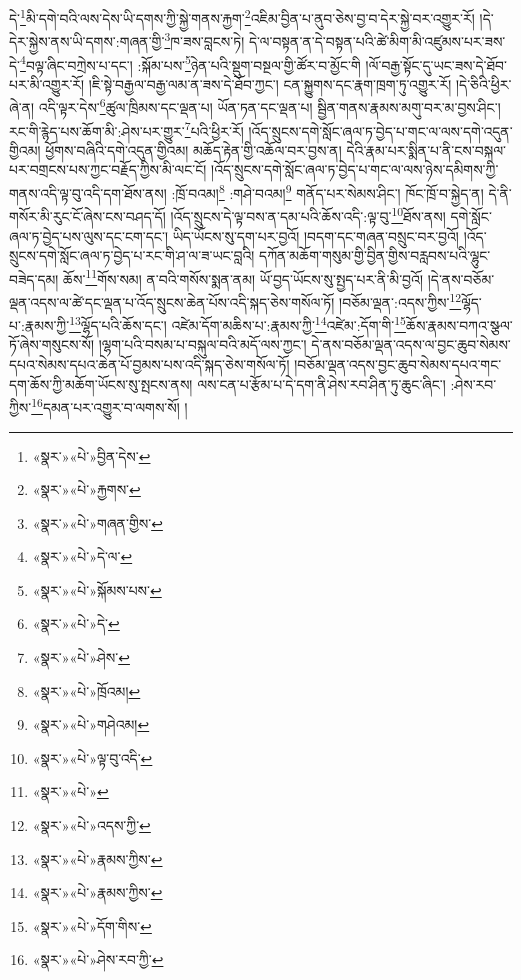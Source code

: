 དེ་\footnote{«སྣར་»«པེ་»བྱིན་དེས་}མི་དགེ་བའི་ལས་དེས་ཡི་དགས་ཀྱི་སྐྱེ་གནས་རྐྱག་\footnote{«སྣར་»«པེ་»རྐྱགས་}འཇིམ་བྱིན་པ་ནུབ་ཅེས་བྱ་བ་དེར་སྐྱེ་བར་འགྱུར་རོ། །དེ་དེར་སྐྱེས་ནས་ཡི་དགས་:གཞན་གྱི་\footnote{«སྣར་»«པེ་»གཞན་གྱིས་}ཁ་ཟས་བླངས་ཏེ། དེ་ལ་བསྟན་ན་དེ་བསྟན་པའི་ཚེ་མིག་མི་འཛུམས་པར་ཟས་དེ་\footnote{«སྣར་»«པེ་»དེ་ལ་}བལྟ་ཞིང་བཀྲེས་པ་དང་། :སྐོམ་པས་\footnote{«སྣར་»«པེ་»སྐོམས་པས་}ཉེན་པའི་སྡུག་བསྔལ་གྱི་ཚོར་བ་མྱོང་གི །ལོ་བརྒྱ་སྟོང་དུ་ཡང་ཟས་དེ་ཐོབ་པར་མི་འགྱུར་རོ། །ཇི་སྟེ་བརྒྱལ་བརྒྱ་ལམ་ན་ཟས་དེ་ཐོབ་ཀྱང་། ངན་སྐྱུགས་དང་རྣག་ཁྲག་ཏུ་འགྱུར་རོ། །དེ་ཅིའི་ཕྱིར་ཞེ་ན། འདི་ལྟར་དེས་\footnote{«སྣར་»«པེ་»དེ་}ཚུལ་ཁྲིམས་དང་ལྡན་པ། ཡོན་ཏན་དང་ལྡན་པ། སྦྱིན་གནས་རྣམས་མགུ་བར་མ་བྱས་ཤིང་། རང་གི་རྙེད་པས་ཆོག་མི་:ཤེས་པར་གྱུར་\footnote{«སྣར་»«པེ་»ཤེས་}པའི་ཕྱིར་རོ། །འོད་སྲུངས་དགེ་སློང་ཞལ་ཏ་བྱེད་པ་གང་ལ་ལས་དགེ་འདུན་གྱིའམ། ཕྱོགས་བཞིའི་དགེ་འདུན་གྱིའམ། མཆོད་རྟེན་གྱི་འཆོལ་བར་བྱས་ན། དེའི་རྣམ་པར་སྨིན་པ་ནི་ངས་བསྐལ་པར་བགྲངས་པས་ཀྱང་བརྗོད་ཀྱིས་མི་ལང་ངོ། །འོད་སྲུངས་དགེ་སློང་ཞལ་ཏ་བྱེད་པ་གང་ལ་ལས་ཉེས་དམིགས་ཀྱི་གནས་འདི་ལྟ་བུ་འདི་དག་ཐོས་ནས། :ཁྲོ་བའམ།\footnote{«སྣར་»«པེ་»ཁྲོའམ།} :གཤེ་བའམ།\footnote{«སྣར་»«པེ་»གཤེའམ།} གནོད་པར་སེམས་ཤིང་། ཁོང་ཁྲོ་བ་སྐྱེད་ན། དེ་ནི་གསོར་མི་རུང་ངོ་ཞེས་ངས་བཤད་དོ། །འོད་སྲུངས་དེ་ལྟ་བས་ན་དམ་པའི་ཆོས་འདི་:ལྟ་བུ་\footnote{«སྣར་»«པེ་»ལྟ་བུ་འདི་}ཐོས་ནས། དགེ་སློང་ཞལ་ཏ་བྱེད་པས་ལུས་དང་ངག་དང་། ཡིད་ཡོངས་སུ་དག་པར་བྱའོ། །བདག་དང་གཞན་བསྲུང་བར་བྱའོ། །འོད་སྲུངས་དགེ་སློང་ཞལ་ཏ་བྱེད་པ་རང་གི་ཤ་ལ་ཟ་ཡང་བླའི། དཀོན་མཆོག་གསུམ་གྱི་བྱིན་གྱིས་བརླབས་པའི་ལྷུང་བཟེད་དམ། ཆོས་\footnote{«སྣར་»«པེ་»}གོས་སམ། ན་བའི་གསོས་སྨན་ནམ། ཡོ་བྱད་ཡོངས་སུ་སྤྱད་པར་ནི་མི་བྱའོ། །དེ་ནས་བཅོམ་ལྡན་འདས་ལ་ཚེ་དང་ལྡན་པ་འོད་སྲུངས་ཆེན་པོས་འདི་སྐད་ཅེས་གསོལ་ཏོ། །བཅོམ་ལྡན་:འདས་ཀྱིས་\footnote{«སྣར་»«པེ་»འདས་ཀྱི་}ལྷོད་པ་:རྣམས་ཀྱི་\footnote{«སྣར་»«པེ་»རྣམས་ཀྱིས་}ལྷོད་པའི་ཆོས་དང་། འཛེམ་དོག་མཆིས་པ་:རྣམས་ཀྱི་\footnote{«སྣར་»«པེ་»རྣམས་ཀྱིས་}འཛེམ་:དོག་གི་\footnote{«སྣར་»«པེ་»དོག་གིས་}ཆོས་རྣམས་བཀའ་སྩལ་ཏོ་ཞེས་གསུངས་སོ། །ལྷག་པའི་བསམ་པ་བསྐུལ་བའི་མདོ་ལས་ཀྱང་། དེ་ནས་བཅོམ་ལྡན་འདས་ལ་བྱང་ཆུབ་སེམས་དཔའ་སེམས་དཔའ་ཆེན་པོ་བྱམས་པས་འདི་སྐད་ཅེས་གསོལ་ཏོ། །བཅོམ་ལྡན་འདས་བྱང་ཆུབ་སེམས་དཔའ་གང་དག་ཆོས་ཀྱི་མཆོག་ཡོངས་སུ་སྤངས་ནས། ལས་ངན་པ་རྩོམ་པ་དེ་དག་ནི་ཤེས་རབ་ཤིན་ཏུ་ཆུང་ཞིང་། :ཤེས་རབ་ཀྱིས་\footnote{«སྣར་»«པེ་»ཤེས་རབ་ཀྱི་}དམན་པར་འགྱུར་བ་ལགས་སོ། །

